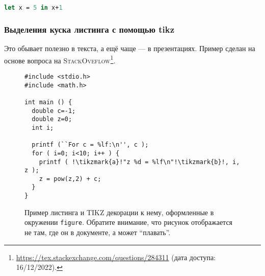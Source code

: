 \begin{lstlisting}[caption={Название для листинга кода. Достаточно длинное, чтобы люди, которые смотрят картинку сразу после названия статьи (т.~е. все люди), смогли разобраться и понять к чему в статье листинги, картинки и прочий ``не текст''.}, language=Caml, frame=single]
  let x = 5 in x+1
\end{lstlisting}



\subsubsection{Выделения куска листинга с помощью tikz}
Это обывает полезно в текста, а ещё чаще --- в презентациях. Пример сделан на основе вопроса на \textsc{StackOveflow}\footnote{\url{https://tex.stackexchange.com/questions/284311} (дата доступа: 16/12/2022).}.

\begin{figure}
\begin{lstlisting}[escapechar=!,basicstyle=\ttfamily]
#include <stdio.h>
#include <math.h>

int main () {
  double c=-1;
  double z=0;
  int i;

  printf (``For c = %lf:\n'', c );
  for ( i=0; i<10; i++ ) {
    printf ( !\tikzmark{a}!"z %d = %lf\n"!\tikzmark{b}!, i, z );
    z = pow(z,2) + c;
  }
}
\end{lstlisting}

\caption{Пример листинга и \textsc{TIKZ} декорации к нему, оформленные в окружении \texttt{figure}. Обратите внимание, что рисунок отображается не там, где он в документе, а может ``плавать''.}
\end{figure}